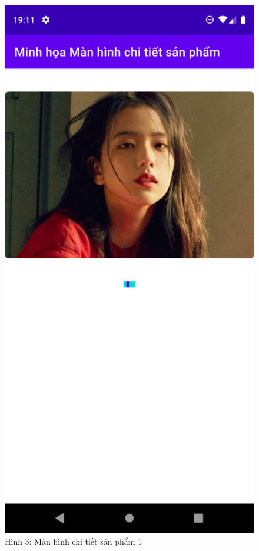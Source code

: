 \documentclass{beamer}
\begin{document}
\begin{frame}
    \begin{columns}
        \begin{figure}
            \centering
            \includegraphics[height=0.7\textheight]{images/32.png}
            \caption{\centering\tiny{Hình 3: Màn hình chi tiết sản phẩm 1}}


\end{figure}
\end{columns}
\end{frame}
\end{document}
